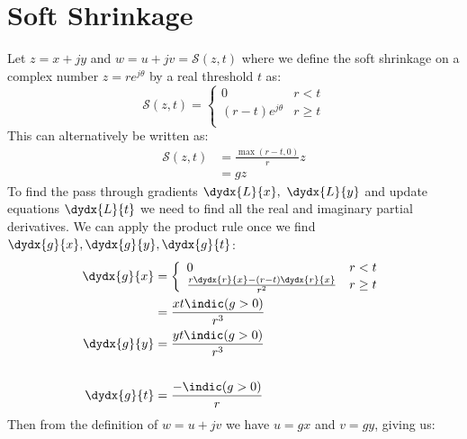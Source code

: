 \section{Soft Shrinkage}\label{sec:appE:soft_shrink}
Let $z = x + jy$ and $w = u+jv = \mathcal{S}(z, t)$ where we define the soft
shrinkage on a complex number $z = re^{j\theta}$ by a real threshold $t$ as:
\begin{equation}
  \mathcal{S}(z, t) = \left\{ \begin{array}{ll}
      0 & r < t \\
      (r-t)e^{j\theta} & r \geq t\\
\end{array}
\right. 
\end{equation}
This can alternatively be written as:
\begin{align}
  \mathcal{S}(z, t) &= \frac{\max(r-t, 0)}{r} z \\
                    &= gz \label{eq:appE:soft}
\end{align}
To find the pass through gradients $\dydx{L}{x},\ \dydx{L}{y}$ and update
equations $\dydx{L}{t}$ we need to find all the real and imaginary partial
derivatives. We can apply the product rule once we find
$\dydx{g}{x},\dydx{g}{y},\dydx{g}{t}$:
\begin{align}
  \dydx{g}{x} &= \left\{ \begin{array}{ll}
      0 & r < t \\
      \frac{r \dydx{r}{x} - (r-t)\dydx{r}{x}}{r^2}  & r \geq t
  \end{array} \right.  \\
  &= \frac{xt\indic(g > 0)}{r^3} \label{eq:appE:dgdx} \\
  \dydx{g}{y}&= \frac{yt\indic(g > 0)}{r^3} \label{eq:appE:dgdy} \\\\
  \dydx{g}{t}&= \frac{-\indic(g > 0)}{r} \label{eq:appE:dgdt}
\end{align}
Then from the definition of $w = u+jv$ we have $u=gx$ and $v=gy$, giving us:

